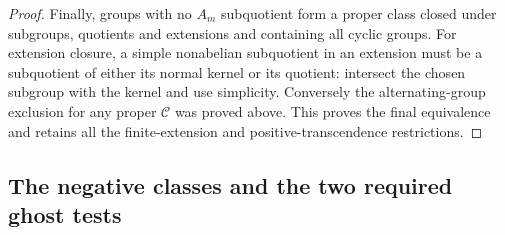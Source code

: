 \documentclass[11pt]{article}
\begin{document}
\begin{proof}
Finally, groups with no \(A_m\) subquotient form a proper
class closed under subgroups, quotients and extensions and
containing all cyclic groups. For extension closure, a simple
nonabelian subquotient in an extension must be a subquotient
of either its normal kernel or its quotient: intersect the
chosen subgroup with the kernel and use simplicity.
Conversely the alternating-group exclusion for any proper
\(\mathcal C\) was proved above. This proves the final
equivalence and retains all the finite-extension and
positive-transcendence restrictions.
\end{proof}

\subsection{The negative classes and the two required ghost tests}
\end{document}
